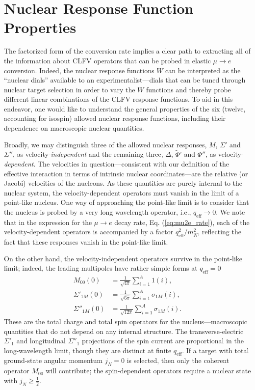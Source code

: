 \documentclass{book}[letterpaper,12pt]
\begin{document}
\chapter{Nuclear Response Function Properties}
\label{chap:nuclear_response}
\thispagestyle{headings}
The factorized form of the conversion rate implies a clear path to extracting all of the information about CLFV operators that can be probed in elastic $\mu\rightarrow e$ conversion. Indeed, the nuclear response functions $W$ can be interpreted as the ``nuclear dials'' available to an experimentalist---dials that can be tuned through nuclear target selection in order to vary the $W$ functions and thereby probe different linear combinations of the CLFV response functions. To aid in this endeavor, one would like to understand the general properties of the six (twelve, accounting for isospin) allowed nuclear response functions, including their dependence on macroscopic nuclear quantities.

Broadly, we may distinguish three of the allowed nuclear responses, $M$, $\Sigma'$ and $\Sigma''$, as velocity-\textit{independent} and the remaining three, $\Delta$, $\tilde{\Phi}$' and $\Phi''$, as velocity-\textit{dependent}. The velocities in question---consistent with our definition of the effective interaction in terms of intrinsic nuclear coordinates---are the relative (or Jacobi) velocities of the nucleons. As these quantities are purely internal to the nuclear system, the velocity-dependent operators must vanish in the limit of a point-like nucleus. One way of approaching the point-like limit is to consider that the nucleus is probed by a very long wavelength operator, i.e., $q_\mathrm{eff}\rightarrow 0$. We note that in the expression for the $\mu\rightarrow e$ decay rate, Eq. (\ref{eq:mu2e_rate}), each of the velocity-dependent operators is accompanied by a factor $q_\mathrm{eff}^2/m_N^2$, reflecting the fact that these responses vanish in the point-like limit. 

On the other hand, the velocity-independent operators survive in the point-like limit; indeed, the leading multipoles have rather simple forms at $q_\mathrm{eff}=0$
\begin{equation}
\begin{split}
M_{00}(0)&=\frac{1}{\sqrt{4\pi}}\sum_{i=1}^A 1(i),\\
\Sigma'_{1M}(0)&=\frac{1}{\sqrt{6\pi}}\sum_{i=1}^A\sigma_{1M}(i),\\
\Sigma''_{1M}(0)&=\frac{1}{\sqrt{12\pi}}\sum_{i=1}^A\sigma_{1M}(i).
\end{split}
\end{equation}
These are the total charge and total spin operators for the nucleus---macroscopic quantities that do not depend on any internal structure. The transverse-electric $\Sigma'_1$ and longitudinal $\Sigma''_1$ projections of the spin current are proportional in the long-wavelength limit, though they are distinct at finite $q_\mathrm{eff}$. If a target with total ground-state angular momentum $j_N=0$ is selected, then only the coherent operator $M_{00}$ will contribute; the spin-dependent operators require a nuclear state with $j_N\geq \frac{1}{2}$. 
\end{document}
